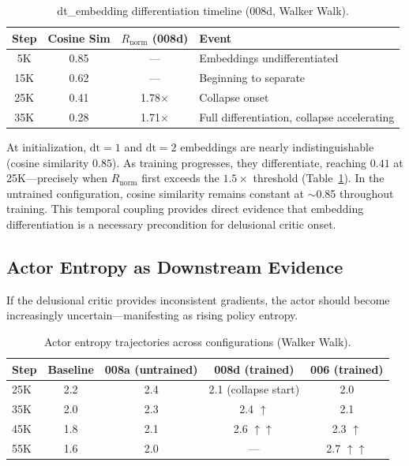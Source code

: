 \documentclass[10pt,letterpaper]{article}
\begin{document}
\begin{table}[h]
\centering
\caption{dt\_embedding differentiation timeline (008d, Walker Walk).}
\label{tab:cosine}
\begin{tabular}{cccl}
\toprule
\textbf{Step} & \textbf{Cosine Sim} & $R_{\text{norm}}$ \textbf{(008d)} & \textbf{Event} \\
\midrule
5K & 0.85 & --- & Embeddings undifferentiated \\
15K & 0.62 & --- & Beginning to separate \\
25K & 0.41 & 1.78$\times$ & Collapse onset \\
35K & 0.28 & 1.71$\times$ & Full differentiation, collapse accelerating \\
\bottomrule
\end{tabular}
\end{table}

At initialization, $\mathrm{dt}{=}1$ and $\mathrm{dt}{=}2$ embeddings are nearly indistinguishable (cosine similarity $0.85$). As training progresses, they differentiate, reaching $0.41$ at 25K---precisely when $R_{\text{norm}}$ first exceeds the $1.5\times$ threshold (Table~\ref{tab:cosine}). In the untrained configuration, cosine similarity remains constant at $\sim$0.85 throughout training. This temporal coupling provides direct evidence that embedding differentiation is a necessary precondition for delusional critic onset.


\subsection{Actor Entropy as Downstream Evidence}
\label{sec:entropy}

If the delusional critic provides inconsistent gradients, the actor should become increasingly uncertain---manifesting as rising policy entropy.

\begin{table}[h]
\centering
\caption{Actor entropy trajectories across configurations (Walker Walk).}
\label{tab:entropy}
\begin{tabular}{lcccc}
\toprule
\textbf{Step} & Baseline & 008a (untrained) & 008d (trained) & 006 (trained) \\
\midrule
25K & 2.2 & 2.4 & 2.1 (collapse start) & 2.0 \\
35K & 2.0 & 2.3 & 2.4 $\uparrow$ & 2.1 \\
45K & 1.8 & 2.1 & 2.6 $\uparrow\uparrow$ & 2.3 $\uparrow$ \\
55K & 1.6 & 2.0 & --- & 2.7 $\uparrow\uparrow$ \\
\bottomrule
\end{tabular}
\end{table}
\end{document}
